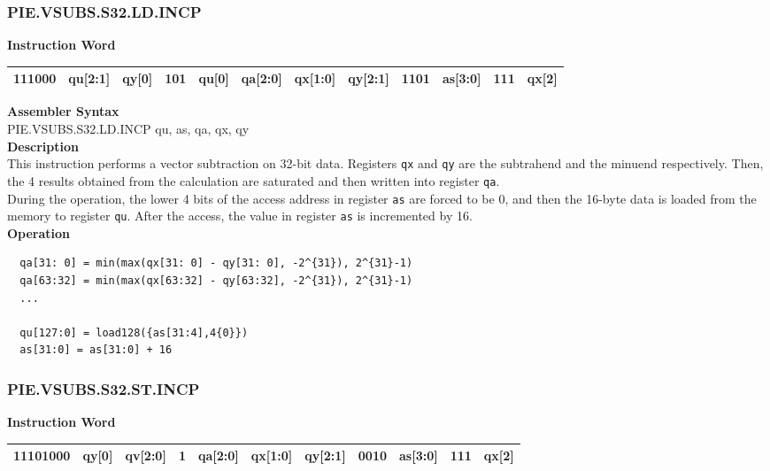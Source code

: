\newpage
\subsubsection{PIE.VSUBS.S32.LD.INCP}\label{instruction:PIEVSUBSS32LDINCP}
\setlength\tabcolsep{6pt}
\textbf{Instruction Word} \\
\begin{tabular}{|c|c|c|c|c|c|c|c|c|c|c|c|}
	\hline
	111000 & qu[2:1] & qy[0] & 101 & qu[0] & qa[2:0] & qx[1:0] & qy[2:1] & 1101 & as[3:0] & 111 & qx[2] \\
	\hline
\end{tabular}

\textbf{Assembler Syntax} \\
PIE.VSUBS.S32.LD.INCP qu, as, qa, qx, qy \\
\textbf{Description} \\
This instruction performs a vector subtraction on 32-bit data. Registers \lstinline{qx} and \lstinline{qy} are the subtrahend and the minuend respectively. Then, the 4 results obtained from the calculation are saturated and then written into register \lstinline{qa}. \\ During the operation, the lower 4 bits of the access address in register \lstinline{as} are forced to be 0, and then the 16-byte data is loaded from the memory to register \lstinline{qu}. After the access, the value in register \lstinline{as} is incremented by 16.\\
\textbf{Operation}
\begin{lstlisting}
  qa[31: 0] = min(max(qx[31: 0] - qy[31: 0], -2^{31}), 2^{31}-1)
  qa[63:32] = min(max(qx[63:32] - qy[63:32], -2^{31}), 2^{31}-1)
  ...

  qu[127:0] = load128({as[31:4],4{0}})
  as[31:0] = as[31:0] + 16
\end{lstlisting}

\newpage
\subsubsection{PIE.VSUBS.S32.ST.INCP}\label{instruction:PIEVSUBSS32STINCP}
\setlength\tabcolsep{6pt}
\textbf{Instruction Word} \\
\begin{tabular}{|c|c|c|c|c|c|c|c|c|c|c|}
	\hline
	11101000 & qy[0] & qv[2:0] & 1 & qa[2:0] & qx[1:0] & qy[2:1] & 0010 & as[3:0] & 111 & qx[2] \\
	\hline
\end{tabular}

